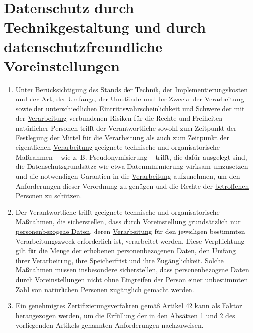 \chapter{Datenschutz durch Technikgestaltung und durch datenschutzfreundliche Voreinstellungen}
\label{ch:25}


\begin{enumerate}

  \item Unter Berücksichtigung des Stands der Technik, der Implementierungskosten und der Art, des Umfangs, der Umstände
   und der Zwecke der \hyperref[itm:04-2]{Verarbeitung} sowie der unterschiedlichen Eintrittswahrscheinlichkeit und Schwere der mit der
   \hyperref[itm:04-2]{Verarbeitung} verbundenen Risiken für die Rechte und Freiheiten natürlicher Personen trifft der Verantwortliche
   sowohl zum Zeitpunkt der Festlegung der Mittel für die \hyperref[itm:04-2]{Verarbeitung} als auch zum Zeitpunkt der eigentlichen
   \hyperref[itm:04-2]{Verarbeitung} geeignete technische und organisatorische Maßnahmen -- wie z. B. Pseudonymisierung -- trifft, die dafür
   ausgelegt sind, die Datenschutzgrundsätze wie etwa Datenminimierung wirksam umzusetzen und die notwendigen Garantien
   in die \hyperref[itm:04-2]{Verarbeitung} aufzunehmen, um den Anforderungen dieser Verordnung zu genügen und die Rechte der \hyperref[itm:04-1]{betroffenen
   Personen} zu schützen.
  \label{itm:25-1}

  \item Der Verantwortliche trifft geeignete technische und organisatorische Maßnahmen, die sicherstellen, dass durch
   Voreinstellung grundsätzlich nur \hyperref[itm:04-1]{personenbezogene Daten}, deren \hyperref[itm:04-2]{Verarbeitung} für den jeweiligen bestimmten
   Verarbeitungszweck erforderlich ist, verarbeitet werden. Diese Verpflichtung gilt für die Menge der erhobenen
   \hyperref[itm:04-1]{personenbezogenen Daten}, den Umfang ihrer \hyperref[itm:04-2]{Verarbeitung}, ihre Speicherfrist und ihre Zugänglichkeit. Solche Maßnahmen
   müssen insbesondere sicherstellen, dass \hyperref[itm:04-1]{personenbezogene Daten} durch Voreinstellungen nicht ohne Eingreifen der
   Person einer unbestimmten Zahl von natürlichen Personen zugänglich gemacht werden.
  \label{itm:25-2}

  \item Ein genehmigtes Zertifizierungsverfahren gemäß \hyperref[ch:42]{Artikel 42} kann als Faktor herangezogen werden,
   um die Erfüllung der in den Absätzen \hyperref[itm:25-1]{1} und \hyperref[itm:25-2]{2} des vorliegenden Artikels
   genannten Anforderungen nachzuweisen.
  \label{itm:25-3}

\end{enumerate}


